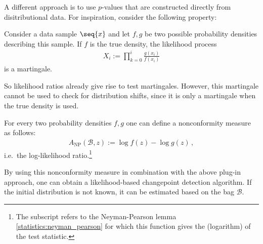     A different approach is to use $p$-values that are constructed directly from disitributional data. For inspiration, consider the following property:
    \begin{property}
        Consider a data sample $\seq{x}$ and let $f,g$ be two possible probability densities describing this sample. If $f$ is the true density, the likelihood process
        \begin{gather}
            X_i := \prod_{k=0}^i \frac{g(x_i)}{f(x_i)}
        \end{gather}
        is a martingale.
    \end{property}
    So likelihood ratios already give rise to test martingales. However, this martingale cannot be used to check for distribution shifts, since it is only a martingale when the true density is used.
    \begin{example}
        For every two probability densities $f,g$ one can define a nonconformity measure as follows:
        \begin{gather}
            A_\mathrm{NP}(\mathcal{B},z) := \log f(z)-\log g(z)\,,
        \end{gather}
        i.e.~the log-likelihood ratio.\footnote{The subscript refers to the Neyman-Pearson lemma \ref{statistics:neyman_pearson} for which this function gives the (logarithm) of the test statistic.}

        By using this nonconformity measure in combination with the above plug-in approach, one can obtain a likelihood-based changepoint detection algorithm. If the initial distribution is not known, it can be estimated based on the bag $\mathcal{B}$.
    \end{example}